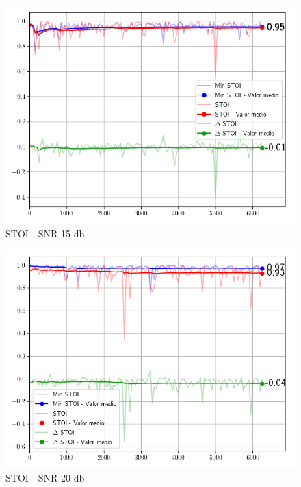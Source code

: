 \begin{figure}
	\centering
	\centerline{\includegraphics[scale=0.75]{images/ch6/af/objective_metrics/metric_STOI_15db.png}}
	\caption{STOI - SNR 15 db}
	\label{fig:ch6_stoi_fifteen_db}
\end{figure}

\begin{figure}
	\centering
	\centerline{\includegraphics[scale=0.75]{images/ch6/af/objective_metrics/metric_STOI_20db.png}}
	\caption{STOI - SNR 20 db}
	\label{fig:ch6_stoi_tweenty_db}
\end{figure}

